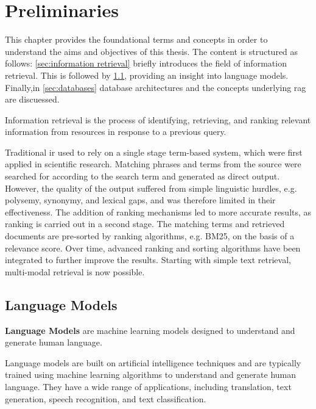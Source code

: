 \chapter{Preliminaries}\label{ch:preliminaries}
This chapter provides the foundational terms and concepts in order to understand the aims and objectives of this thesis.
%
The content is structured as follows: \cref{sec:information retrieval} briefly introduces the field of information retrieval. This is followed by \cref{sec:language-models}, providing an insight into language models. 
Finally,in \cref{sec:databases} database architectures and the concepts underlying \ac{rag} are discuessed. 
%
\begin{definition}\label{def:information retrieval}
Information retrieval is the process of identifying, retrieving, and ranking relevant information from resources in response to a previous query. 
\end{definition}
%
Traditional \ac{ir} used to rely on a single stage term-based system, which were first applied in scientific research. Matching phrases and terms from the source were searched for according to the search term and generated as direct output.
However, the quality of the output suffered from simple linguistic hurdles, e.g. polysemy, synonymy, and lexical gaps, and was therefore limited in their effectiveness. 
The addition of ranking mechanisms led to more accurate results, as ranking is carried out in a second stage. The matching terms and retrieved documents are pre-sorted by ranking algorithms, e.g. BM25, on the basis of a relevance score. 
Over time, advanced ranking and sorting algorithms have been integrated to further improve the results. \citep{hambardeIR2023}
Starting with simple text retrieval, multi-modal retrieval is now possible.
\section{Language Models}\label{sec:language-models}
%
\begin{definition}\label{def:language-models}
    \textbf{Language Models} are machine learning models designed to understand and generate human language.
\end{definition}
Language models are built on artificial intelligence techniques and are typically trained using machine learning algorithms to understand and generate human language. 
They have a wide range of applications, including translation, text generation, speech recognition, and text classification.
